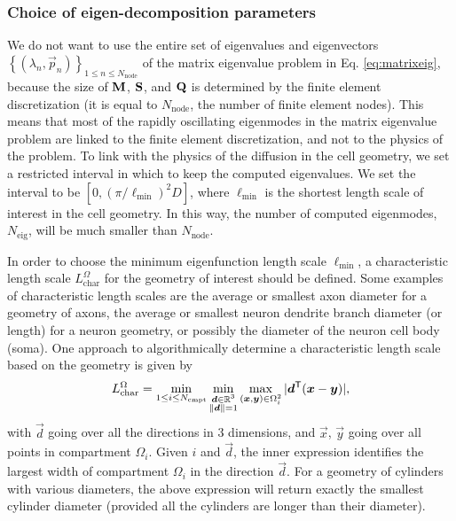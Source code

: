 \documentclass[a4paper]{article}
\begin{document}
\subsubsection{Choice of eigen-decomposition parameters} \label{sec:neig_choice}

We do not want to use the entire set of eigenvalues and eigenvectors $\left\{(\lambda_n, \vec{p}_n)\right\}_{1 \leq n \leq N_\text{node}}$ of the matrix eigenvalue problem in Eq. \eqref{eq:matrixeig}, because the size of $\mathbf{M}$, $\mathbf{S}$, and $\mathbf{Q}$ is determined by the finite element discretization (it is equal to $N_\text{node}$, the number of finite element nodes). This means that most of the rapidly oscillating eigenmodes in the matrix eigenvalue problem are linked to the finite element discretization, and not to the physics of the problem. To link with the physics of the diffusion in the cell geometry, we set a restricted interval in which to keep the computed eigenvalues. We set the interval to be $[0, (\pi / \ell_\text{min})^2 D]$, where $\ell_\text{min}$ is the shortest length scale of interest in the cell geometry. In this way, the number of computed eigenmodes, $N_\text{eig}$, will be much smaller than $N_\text{node}$.

In order to choose the minimum eigenfunction length scale $\ell_\text{min}$, a characteristic length scale $L_\text{char}^\Omega$ for the geometry of interest should be defined. Some examples of characteristic length scales are the average or smallest axon diameter for a geometry of axons, the average or smallest neuron dendrite branch diameter (or length) for a neuron geometry, or possibly the diameter of the neuron cell body (soma). One approach to algorithmically determine a characteristic length scale based on the geometry is given by
\begin{equation} \label{eq:L_char}
    L_\text{char}^\Omega = \min_{1 \leq i \leq N_\text{cmpt}} \min_{\substack{\bm{d} \in \mathbb{R}^3 \\ \|\bm{d}\| = 1}} \max_{(\bm{x}, \bm{y}) \in \Omega_i^2} |\bm{d}^{\mathsf{T}} (\bm{x} - \bm{y})|,
\end{equation}
with $\vec{d}$ going over all the directions in 3 dimensions, and $\vec{x}$, $\vec{y}$ going over all points in compartment $\Omega_i$. Given $i$ and $\vec{d}$, the inner expression identifies the largest width of compartment $\Omega_i$ in the direction $\vec{d}$. For a geometry of cylinders with various diameters, the above expression will return exactly the smallest cylinder diameter (provided all the cylinders are longer than their diameter).
\end{document}
